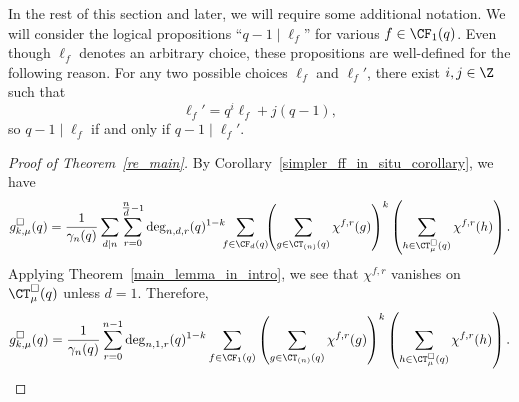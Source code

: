 In the rest of this section and later, we will require some additional notation.
We will consider the logical propositions ``\(q-1 \mid \ell_f\)'' for various \(f \in \CF_1 (q)\).
Even though \(\ell_f\) denotes an arbitrary choice, these propositions are well-defined for the following reason.
For any two possible choices \(\ell_f\) and \(\ell_f'\), there exist \(i,j \in \Z\) such that
\begin{equation}
\ell_f' = q^i \ell_f + j(q-1),
\end{equation}
so \(q-1 \mid \ell_f\) if and only if \(q-1 \mid \ell_f'\).







\begin{proof}[Proof of Theorem~\ref{re_main}]
By Corollary~\ref{simpler_ff_in_situ_corollary}, we have
\[
g_{k,\mu}^\Box (q)
=
\frac{1}{\gamma_n(q)}
\sum_{d \mid n}
\sum_{r = 0}^{\tfrac{n}{d} - 1}
\deg_{n,d,r}(q)^{1-k}
\hspace{-0.15cm} \sum_{f \in \CF_d (q)}
\hspace{-0.15cm}  \left (
\sum_{g \in \CT_{(n)} (q)} \chi^{f,r} (g)
\right )^k
\left (
\sum_{h \in \CT^\Box_\mu (q)} \chi^{f,r} (h)
\right ).
\]
Applying Theorem~\ref{main_lemma_in_intro}, we see that \(\chi^{f,r}\) vanishes on \(\CT_\mu^\Box (q)\) unless \(d = 1\).
Therefore,
\begin{equation}
\label{nepenthe}
g_{k,\mu}^\Box (q)
=
\frac{1}{\gamma_n(q)}
\sum_{r = 0}^{n - 1}
\deg_{n,1,r}(q)^{1-k}
\sum_{f \in \CF_1 (q)}
\left (
\sum_{g \in \CT_{(n)} (q)} \chi^{f,r} (g)
\right )^k
\left (
\sum_{h \in \CT_\mu^\Box (q)} \chi^{f,r} (h)
\right ).
\end{equation}


\end{proof}
